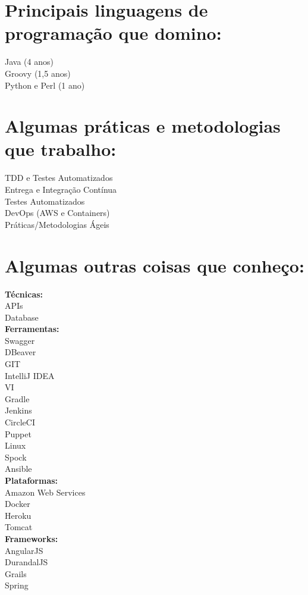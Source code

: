 \documentclass[]{friggeri-cv}
\begin{document}
\section{Principais linguagens de programação que domino:}
Java (4 anos)\\
Groovy (1,5 anos)\\
Python e Perl (1 ano)\\

\section{Algumas práticas e metodologias que trabalho:}
\begin{multicols}{2}
    TDD e Testes Automatizados\\
    Entrega e Integração Contínua\\
    Testes Automatizados\\
    DevOps (AWS e Containers)\\
    Práticas/Metodologias Ágeis\\
\end{multicols}

\section{Algumas outras coisas que conheço:}
\begin{multicols}{3}
    \textbf{Técnicas:}\\
    APIs\\
    Database\\
    \textbf{Ferramentas:}\\
    Swagger\\
    DBeaver\\
    GIT\\
    IntelliJ IDEA\\
    VI\\
    Gradle\\
    Jenkins\\
    CircleCI\\
    Puppet\\
    Linux\\
    Spock\\
    Ansible\\
    \textbf{Plataformas:}\\
    Amazon Web Services\\
    Docker\\
    Heroku\\
    Tomcat\\
    \textbf{Frameworks:}\\
    AngularJS\\
    DurandalJS\\
    Grails\\
    Spring
\end{multicols}
\end{document}
